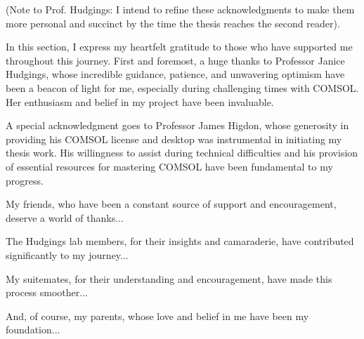 (Note to Prof. Hudgings: I intend to refine these acknowledgments to make them more personal and succinct by the time the thesis reaches the second reader).

In this section, I express my heartfelt gratitude to those who have supported me throughout this journey. First and foremost, a huge thanks to Professor Janice Hudgings, whose incredible guidance, patience, and unwavering optimism have been a beacon of light for me, especially during challenging times with COMSOL. Her enthusiasm and belief in my project have been invaluable.

A special acknowledgment goes to Professor James Higdon, whose generosity in providing his COMSOL license and desktop was instrumental in initiating my thesis work. His willingness to assist during technical difficulties and his provision of essential resources for mastering COMSOL have been fundamental to my progress.

My friends, who have been a constant source of support and encouragement, deserve a world of thanks...

The Hudgings lab members, for their insights and camaraderie, have contributed significantly to my journey...

My suitemates, for their understanding and encouragement, have made this process smoother...

And, of course, my parents, whose love and belief in me have been my foundation...

